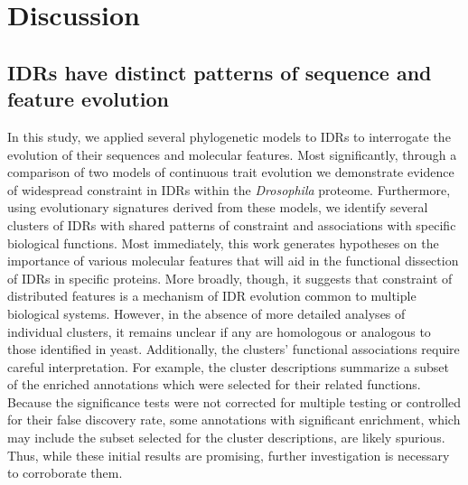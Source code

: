 
\section{Discussion}
\subsection{IDRs have distinct patterns of sequence and feature evolution}
In this study, we applied several phylogenetic models to IDRs to interrogate the evolution of their sequences and molecular features. Most significantly, through a comparison of two models of continuous trait evolution we demonstrate evidence of widespread constraint in IDRs within the \textit{Drosophila} proteome. Furthermore, using evolutionary signatures derived from these models, we identify several clusters of IDRs with shared patterns of constraint and associations with specific biological functions. Most immediately, this work generates hypotheses on the importance of various molecular features that will aid in the functional dissection of IDRs in specific proteins. More broadly, though, it suggests that constraint of distributed features is a mechanism of IDR evolution common to multiple biological systems. However, in the absence of more detailed analyses of individual clusters, it remains unclear if any are homologous or analogous to those identified in yeast. Additionally, the clusters' functional associations require careful interpretation. For example, the cluster descriptions summarize a subset of the enriched annotations which were selected for their related functions. Because the significance tests were not corrected for multiple testing or controlled for their false discovery rate, some annotations with significant enrichment, which may include the subset selected for the cluster descriptions, are likely spurious. Thus, while these initial results are promising, further investigation is necessary to corroborate them.


